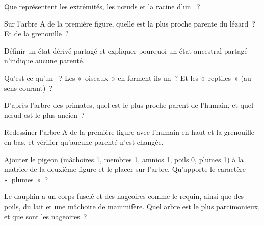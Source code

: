 \begin{exercise}[$\star$]\label{exo:g12:phylogenetic-trees:1}
Que représentent les extrémités, les nœuds et la racine d'un ~?
\end{exercise}

\begin{exercise}[$\star$]\label{exo:g12:phylogenetic-trees:2}
Sur l'arbre A de la première figure, quelle  est la plus proche
parente du lézard~? Et de la grenouille~?
\end{exercise}

\begin{exercise}[$\star$]\label{exo:g12:phylogenetic-trees:3}
Définir un état dérivé partagé et expliquer pourquoi un état ancestral
partagé n'indique aucune parenté.
\end{exercise}

\begin{exercise}[$\star$]\label{exo:g12:phylogenetic-trees:4}
Qu'est-ce qu'un ~? Les «~oiseaux~» en forment-ils un~? Et les
«~reptiles~» (au sens courant)~?
\end{exercise}

\begin{exercise}[$\star$]\label{exo:g12:phylogenetic-trees:5}
D'après l'arbre des primates, quel est le plus proche parent de
l'humain, et quel nœud est le plus ancien~?
\end{exercise}

\begin{exercise}[$\star\star$]\label{exo:g12:phylogenetic-trees:6}
Redessiner l'arbre A de la première figure avec l'humain en haut et la
grenouille en bas, et vérifier qu'aucune parenté n'est changée.
\end{exercise}

\begin{exercise}[$\star\star$]\label{exo:g12:phylogenetic-trees:7}
Ajouter le pigeon (mâchoires 1, membres 1, amnios 1, poils 0, plumes
1) à la matrice de la deuxième figure et le placer sur l'arbre.
Qu'apporte le caractère «~plumes~»~?
\end{exercise}

\begin{exercise}[$\star\star$]\label{exo:g12:phylogenetic-trees:8}
Le dauphin a un corps fuselé et des nageoires comme le requin, ainsi
que des poils, du lait et une mâchoire de mammifère. Quel arbre est le
plus parcimonieux, et que sont les nageoires~?
\end{exercise}

